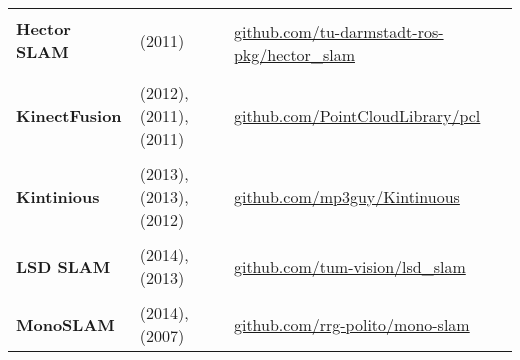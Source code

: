 \documentclass[a4paper,12pt]{scrartcl}
\begin{document}
{\begin{longtable}{l|l|l}
                           &                                                                                             &                                                                       \\ [-3mm]
    \textbf{Hector SLAM}   & \cite{Kohlbrecher2011} (2011)                                                               & \multirow{2}{17em}{\url{github.com/tu-darmstadt-ros-pkg/hector_slam}} \\
                           &                                                                                             &                                                                       \\
                           &                                                                                             &                                                                       \\ [-3mm]
    \textbf{KinectFusion}  & \cite{Pirovano2012} (2012), \cite{Izadi2011} (2011), \cite{Newcombe2011a} (2011)            & {\url{github.com/PointCloudLibrary/pcl}}                              \\
                           &                                                                                             &                                                                       \\ [-3mm]
    \textbf{Kintinious}    & \cite{Whelan2013a} (2013), \cite{Whelan2013} (2013), \cite{Whelan2012} (2012)               & {\url{github.com/mp3guy/Kintinuous}}                                  \\
                           &                                                                                             &                                                                       \\ [-3mm]
    \textbf{LSD SLAM}      & \cite{Engel2014} (2014), \cite{Engel2013} (2013)                                            & {\url{github.com/tum-vision/lsd_slam}}                                \\
                           &                                                                                             &                                                                       \\ [-3mm]
    \textbf{MonoSLAM}      & \cite{Russo2014} (2014), \cite{Davison2007} (2007)                                          & {\url{github.com/rrg-polito/mono-slam}}                               \\

\end{longtable}}
\end{document}
